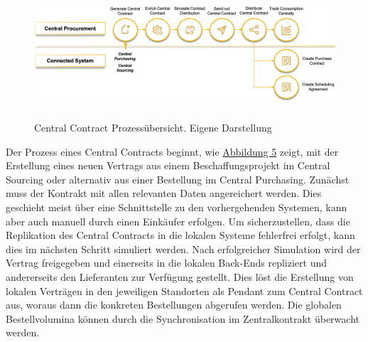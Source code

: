 \begin{figure}[H]
    \centering
    \includegraphics[height=4.8cm]{Bilder/Central_Contract_Process3.png}
    \caption[Central Contract Prozessübersicht]{Central Contract Prozessübersicht. Eigene Darstellung}
    \label{fig:Central_Contract_Process3}
\end{figure}

Der Prozess eines Central Contracts beginnt, wie \hyperref[fig:Central_Contract_Process3]{Abbildung 5} zeigt, mit der Erstellung eines neuen Vertrags aus einem Beschaffungsprojekt im Central Sourcing oder alternativ aus einer Bestellung im Central Purchasing. Zunächst muss der Kontrakt mit allen relevanten Daten angereichert werden. Dies geschieht meist über eine Schnittstelle zu den vorhergehenden Systemen, kann aber auch manuell durch einen Einkäufer erfolgen. Um sicherzustellen, dass die Replikation des Central Contracts in die lokalen Systeme fehlerfrei erfolgt, kann dies im nächsten Schritt simuliert werden. Nach erfolgreicher Simulation wird der Vertrag freigegeben und einerseits in die lokalen Back-Ends repliziert und andererseits den Lieferanten zur Verfügung gestellt. Dies löst die Erstellung von lokalen Verträgen in den jeweiligen Standorten als Pendant zum Central Contract aus, woraus dann die konkreten Bestellungen abgerufen werden. Die globalen Bestellvolumina können durch die Synchronisation im Zentralkontrakt überwacht werden.